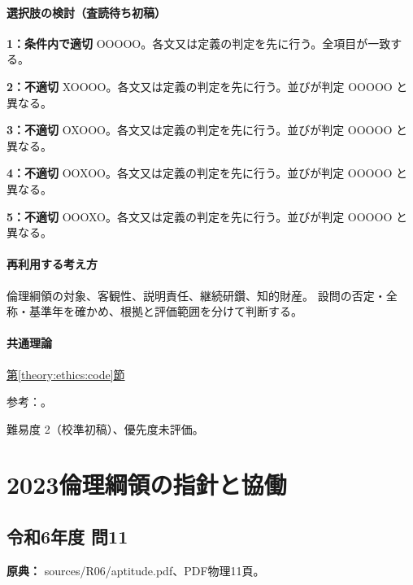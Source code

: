 \paragraph{選択肢の検討（査読待ち初稿）}\mbox{}\par

\noindent\textbf{1：条件内で適切} OOOOO。各文又は定義の判定を先に行う。全項目が一致する。\par

\noindent\textbf{2：不適切} XOOOO。各文又は定義の判定を先に行う。並びが判定 OOOOO と異なる。\par

\noindent\textbf{3：不適切} OXOOO。各文又は定義の判定を先に行う。並びが判定 OOOOO と異なる。\par

\noindent\textbf{4：不適切} OOXOO。各文又は定義の判定を先に行う。並びが判定 OOOOO と異なる。\par

\noindent\textbf{5：不適切} OOOXO。各文又は定義の判定を先に行う。並びが判定 OOOOO と異なる。\par

\paragraph{再利用する考え方} 倫理綱領の対象、客観性、説明責任、継続研鑽、知的財産。 設問の否定・全称・基準年を確かめ、根拠と評価範囲を分けて判断する。

\paragraph{共通理論} \hyperref[theory:ethics:code]{第\ref*{theory:ethics:code}節}

\par 参考：\cite{ipej_ethics2011}。

\par 難易度 2（校準初稿）、優先度未評価。

\section{2023倫理綱領の指針と協働}

\subsection{令和6年度 問11}
\label{q:r06-reg-apt-11}

\noindent\textbf{原典：} sources/R06/aptitude.pdf、PDF物理11頁。

